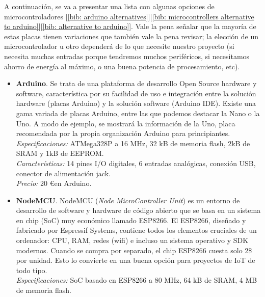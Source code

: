 \documentclass[12pt]{article}
\begin{document}
	\noindent A continuación, se va a presentar una lista con algunas opciones de microcontroladores [\ref{bib: arduino alternatives}][\ref{bib: microcontrollers alternative to arduino}][\ref{bib: alternative to arduino}]. Vale la pena señalar que la mayoría de estas placas tienen variaciones que también vale la pena revisar; la elección de un microcontrolador u otro dependerá de lo que necesite nuestro proyecto (si necesita muchas entradas porque tendremos muchos periféricos, si necesitamos ahorro de energía al máximo, o una buena potencia de procesamiento, etc). \\
	
	\begin{itemize}
		\item \textbf{Arduino}. Se trata de una plataforma de desarrollo Open Source hardware y software, característica por su facilidad de uso e integración entre la solución hardware (placas Arduino) y la solución software (Arduino IDE). Existe una gama variada de placas Arduino, entre las que podemos destacar la Nano o la Uno. A modo de ejemplo, se mostrará la información de la Uno, placa recomendada por la propia organización Arduino para principiantes.\\
		
		\textit{Especificaciones:} ATMega328P a 16 MHz, 32 kB de memoria flash, 2kB de SRAM y 1kB de EEPROM.\\
		
		\textit{Características:} 14 pines I/O digitales, 6 entradas analógicas, conexión USB, conector de alimentación jack. \\
		
		\textit{Precio:} 20 \euro \enspace en Arduino.\\
		
		\item \textbf{NodeMCU}. NodeMCU (\textit{Node MicroController Unit}) es un entorno de desarrollo de software y hardware de código abierto que se basa en un sistema en chip (SoC) muy económico llamado ESP8266. El ESP8266, diseñado y fabricado por Espressif Systems, contiene todos los elementos cruciales de un ordenador: CPU, RAM, redes (wifi) e incluso un sistema operativo y SDK modernos. Cuando se compra por separado, el chip ESP8266 cuesta solo 2\$ por unidad. Esto lo convierte en una buena opción para proyectos de IoT de todo tipo. \\
		
		\textit{Especificaciones:} SoC basado en ESP8266 a 80 MHz, 64 kB de SRAM, 4 MB de memoria flash.\\ 
		

\end{itemize}
\end{document}
